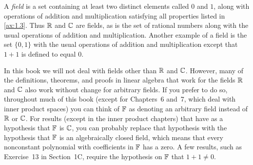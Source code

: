 A \emph{field} is a set containing at least two distinct elements called $0$
and $1$, along with operations of addition and multiplication satisfying all
properties listed in \ref{ax:1.3}. Thus $\mathbb{R}$ and $\mathbb{C}$ are fields, as is the set
of rational numbers along with the usual operations of addition and
multiplication. Another example of a field is the set $\{0,1\}$ with the usual
operations of addition and multiplication except that $1+1$ is defined to
equal $0$.

In this book we will not deal with fields other than $\mathbb{R}$ and $\mathbb{C}$. However,
many of the definitions, theorems, and proofs in linear algebra that work for
the fields $\mathbb{R}$ and $\mathbb{C}$ also work without change for arbitrary fields. If you
prefer to do so, throughout much of this book (except for Chapters~6 and~7,
which deal with inner product spaces) you can think of $\mathbb{F}$ as denoting an
arbitrary field instead of $\mathbb{R}$ or $\mathbb{C}$. For results (except in the inner
product chapters) that have as a hypothesis that $\mathbb{F}$ is $\mathbb{C}$, you can probably
replace that hypothesis with the hypothesis that $\mathbb{F}$ is an algebraically
closed field, which means that every nonconstant polynomial with coefficients
in $\mathbb{F}$ has a zero. A few results, such as Exercise~13 in Section~1C, require
the hypothesis on $\mathbb{F}$ that $1+1\ne0$.


